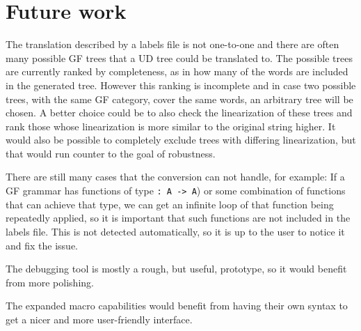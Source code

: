 

\section{Future work}

% 

The translation described by a labels file is not one-to-one and there are often many possible GF trees that a UD tree could be translated to. The possible trees are currently ranked by completeness, as in how many of the words are included in the generated tree. However this ranking is incomplete and in case two possible trees, with the same GF category, cover the same words, an arbitrary tree will be chosen. A better choice could be to also check the linearization of these trees and rank those whose linearization is more similar to the original string higher. It would also be possible to completely exclude trees with differing linearization, but that would run counter to the goal of robustness.

There are still many cases that the conversion can not handle, for example: If a GF grammar has functions of type \lstinline{: A -> A}) or some combination of functions that can achieve that type, we can get an infinite loop of that function being repeatedly applied, so it is important that such functions are not included in the labels file. This is not detected automatically, so it is up to the user to notice it and fix the issue.

The debugging tool is mostly a rough, but useful, prototype, so it would benefit from more polishing.

The expanded macro capabilities would benefit from having their own syntax to get a nicer and more user-friendly interface.

